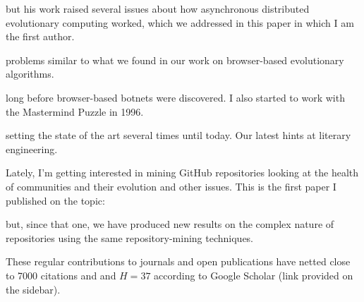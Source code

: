 \documentclass[]{friggeri-jj-cv}
\begin{document}
\cite{evag:gpem}
but his work raised several issues about how asynchronous distributed
evolutionary computing worked, which we addressed in this paper in
which I am the first author.

\cite{jj:2008:PPSN}
problems similar to what we found in our work on browser-based
evolutionary algorithms.

\cite{agajaj}
long before browser-based botnets were discovered. I also started to
work with the Mastermind Puzzle in 1996.

\cite{jj-ppsn96}
setting the state of the art several times until today. Our latest hints at 
literary engineering.

\cite{2014arXiv1403.3084G}

Lately, I'm getting interested in mining GitHub repositories looking
at the health of communities and their evolution and other
issues. This is the first paper I published on the topic:

\cite{2016arXiv160107862M}

but, since that one, we have produced new results on the complex
nature of repositories using the same repository-mining techniques.

These regular contributions to journals and open publications have
netted close to 7000 citations and and $H=37$ according to Google Scholar (link provided on
the sidebar).

\end{document}
